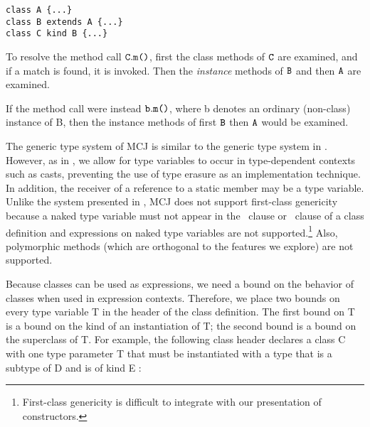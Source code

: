 \documentclass[10pt]{acm-sigplan}
\begin{document}
\begin{verbatim}
class A {...}
class B extends A {...}
class C kind B {...}
\end{verbatim}

To resolve the method call ${\mathtt{{C}}}{\mathtt .}{\mbox {\tt m}\mbox{\tt (}{\overline{{}}}\mbox{\tt )}}$, first the class
methods of $\mathtt{{C}}$ are examined, and if a match is found, it is invoked.
Then the \emph{instance} methods of $\mbox {\tt B}$ and then $\mbox {\tt A}$ are examined.

If the method call were instead ${\mbox {\tt b}}{\mathtt .}{\mbox {\tt m}\mbox{\tt (}{\overline{{}}}\mbox{\tt )}}$, where {\txt
b} denotes an ordinary (non-class) instance of {\txt B}, then the
instance methods of first $\mbox {\tt B}$ then $\mbox {\tt A}$ would be examined.






The generic type system of MCJ is similar to the generic type system
in \FGJ. However, as in \cite{NextGen, DimUnits}, we allow for type
variables to occur in type-dependent contexts such as casts,
preventing the use of type erasure as an implementation technique. In
addition, the receiver of a reference to a static member may be a type
variable. Unlike the system presented in \cite{MixGen}, MCJ does not
support first-class genericity because a naked type variable must not
appear in the \extends\ clause or \kind\ clause of a class definition
and {} expressions on naked type variables are not
supported.\footnote{First-class genericity is difficult to integrate
with our presentation of constructors.} Also, polymorphic methods
(which are orthogonal to the features we explore) are not supported.

Because classes can be used as expressions, we need a bound on the
behavior of classes when used in expression contexts.  Therefore, we
place two bounds on every type variable {\txt T} in the header of the
class definition. The first bound on {\txt T} is a bound on the kind
of an instantiation of {\txt T}; the second bound is a bound on the
superclass of {\txt T}. For example, the following class header
declares a class {\txt C} with one type parameter {\txt T} that must
be instantiated with a type that is a subtype of {\txt D} and is of
kind {\txt E} :
\end{document}
